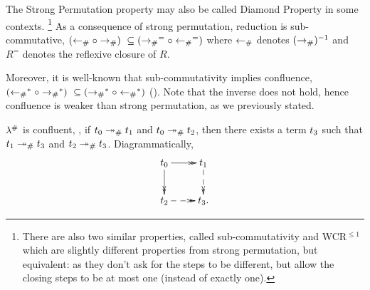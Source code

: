 \bigskip


The Strong Permutation property may also be called Diamond Property in some contexts.
\footnote{There are also two similar properties, called sub-commutativity and WCR$^{\leq 1}$
which are slightly different properties
from strong permutation,
but equivalent:
as they don't ask for the steps to be different,
but allow the closing steps to be at most one (instead of exactly one).}
As a consequence of strong permutation, reduction is sub-commutative,
\ie $(\mathrel{\leftarrow_{\mathtt{\#}}} \circ \mathrel{\to_{\mathtt{\#}}})\ \subseteq (\mathrel{\to_{\mathtt{\#}}}^= \circ \mathrel{\leftarrow_{\mathtt{\#}}}^=)$
where
$\mathrel{\leftarrow_{\mathtt{\#}}}$ denotes $(\mathrel{\to_{\mathtt{\#}}})^{-1}$
and $R^=$ denotes the reflexive closure of $R$.

Moreover, it is well-known that sub-commutativity implies confluence,
\ie $(\mathrel{\leftarrow_{\mathtt{\#}}}^* \circ \mathrel{\to_{\mathtt{\#}}}^*)\ \subseteq (\mathrel{\to_{\mathtt{\#}}}^* \circ \mathrel{\leftarrow_{\mathtt{\#}}}^*)$
(\cf \cite[Proposition 1.1.10]{Terese}). Note that the
inverse does not hold, hence confluence is weaker than strong permutation, as we previously stated.

\begin{corollary}[Confluence]
$\lambda^{\mathtt{\#}}$ is confluent, \ie,
if $t_0 \mathrel{\mathrel{\twoheadrightarrow}_{\mathtt{\#}}} t_1$ and $t_0 \mathrel{\mathrel{\twoheadrightarrow}_{\mathtt{\#}}} t_2$, then there exists a term $t_3$
such that $t_1 \mathrel{\mathrel{\twoheadrightarrow}_{\mathtt{\#}}} t_3$ and $t_2 \mathrel{\mathrel{\twoheadrightarrow}_{\mathtt{\#}}} t_3$.
Diagrammatically,
\[
    \xymatrix{
      \tm_0 \ar@{->>}[d]
            \ar@{->>}[r] &
      \tm_1 \ar@{-->>}[d] \\
            \ar@{-->>}[r]
      \tm_2 &
      \tm_3. \\
    }
\]
\end{corollary}


